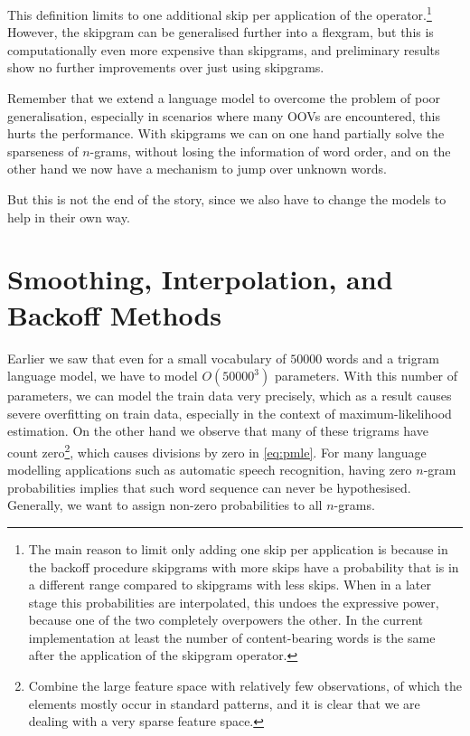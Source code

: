 This definition limits to one additional skip per application of the operator.\footnote{The main reason to limit only adding one skip per application is because in the backoff procedure skipgrams with more skips have a probability that is in a different range compared to skipgrams with less skips. When in a later stage this probabilities are interpolated, this undoes the expressive power, because one of the two completely overpowers the other. In the current implementation at least the number of content-bearing words is the same after the application of the skipgram operator.} However, the skipgram can be generalised further into a flexgram\cite{gompel2016efficient}, but this is computationally even more expensive than skipgrams, and preliminary results show no further improvements over just using skipgrams.

Remember that we extend a language model to overcome the problem of poor generalisation, especially in scenarios where many OOVs are encountered, this hurts the performance. With skipgrams we can on one hand partially solve the sparseness of $n$-grams, without losing the information of word order, and on the other hand we now have a mechanism to jump over unknown words.

But this is not the end of the story, since we also have to change the models to help in their own way.


\section{Smoothing, Interpolation, and Backoff Methods}
Earlier we saw that even for a small vocabulary of $50000$ words and a trigram language model, we have to model $O(50000^3)$ parameters. With this number of parameters, we can model the train data very precisely, which as a result causes severe overfitting on train data, especially in the context of maximum-likelihood estimation. On the other hand we observe that many of these trigrams have count zero\footnote{Combine the large feature space with relatively few observations, of which the elements mostly occur in standard patterns, and it is clear that we are dealing with a very sparse feature space.}, which causes divisions by zero in \cref{eq:pmle}. For many language modelling applications such as automatic speech recognition, having zero $n$-gram probabilities implies that such word sequence can never be hypothesised. Generally, we want to assign non-zero probabilities to all $n$-grams.\cite{jevtic2005estimation}

